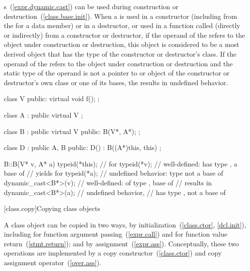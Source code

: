 \pnum
{}%
%
%
%
s~(\ref{expr.dynamic.cast}) can be used during construction
or destruction~(\ref{class.base.init}). When a
is used in a constructor (including from the
for a data member)
or in a destructor, or used in a function called (directly or indirectly) from
a constructor or destructor, if the operand of the
refers to the object under construction or destruction, this object is
considered to be a most derived object that has the type of the constructor or
destructor's class.
If the operand of the
refers to the object under construction or destruction and the static type of
the operand is not a pointer to or object of the constructor or destructor's
own class or one of its bases, the
results in undefined behavior.

\pnum
\enterexample

\begin{codeblock}
class V {
public:
	virtual void f();
};

class A : public virtual V { };

class B : public virtual V {
public:
	B(V*, A*);
};

class D : public A, B {
public:
	D() : B((A*)this, this) { }
};

B::B(V* v, A* a) {
	typeid(*this);          //  for 
	typeid(*v);             // well-defined:  has type , a base of 
                                // yields  for 
	typeid(*a);             // undefined behavior: type  not a base of 
	dynamic_cast<B*>(v);    // well-defined:  of type ,  base of 
                                // results in 
	dynamic_cast<B*>(a);    // undefined behavior,
                                //  has type ,  not a base of 
}
\end{codeblock}
\exitexampleb%
%

[class.copy]{Copying class objects}%
%
%
%

\pnum
A class object can be copied in two ways,
by initialization~(\ref{class.ctor}, \ref{dcl.init}), including for function
argument passing~(\ref{expr.call}) and for function value return~(\ref{stmt.return});
and by assignment~(\ref{expr.ass}).
Conceptually, these two operations are implemented by a
copy constructor~(\ref{class.ctor})
and copy assignment operator~(\ref{over.ass}).

